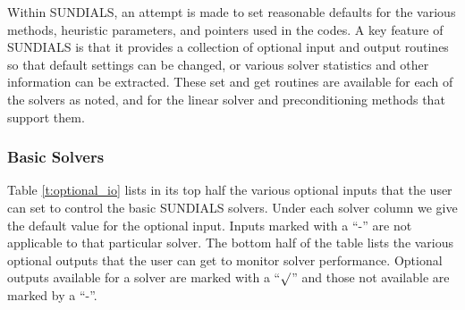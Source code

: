 Within SUNDIALS, an attempt is made to set reasonable defaults for the
various methods, heuristic parameters, and pointers used in the
codes. 
A key feature of SUNDIALS is that it provides a collection of optional
input and output routines so that default settings can be changed, or
various solver statistics and other information can be extracted.
These set and get routines are available for each of the solvers as
noted, and for the linear solver and preconditioning methods that
support them.

\subsubsection*{Basic Solvers} 
Table \ref{t:optional_io} lists in its top half the various optional 
inputs that the user can set to control the basic SUNDIALS solvers.
Under each solver column we give the default value for the optional 
input. Inputs marked with a ``-'' are not applicable to that particular 
solver. The bottom half of the table lists the various optional 
outputs that the user can get to monitor solver performance.
Optional outputs available for a solver are marked with a ``$\surd$''
and those not available are marked by a ``-''.

